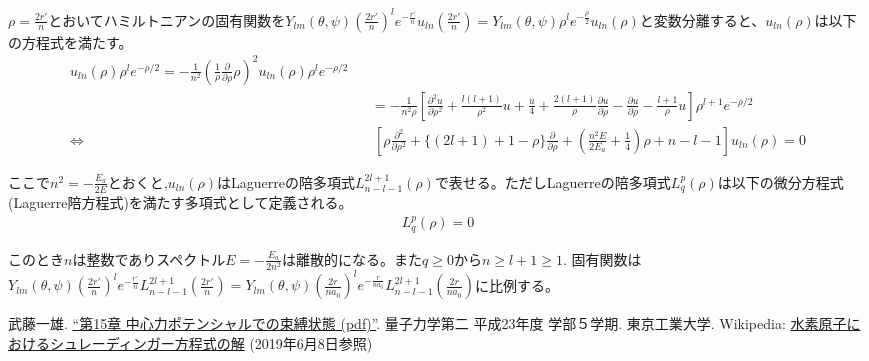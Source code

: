 \documentclass[11pt,a4paper]{jsarticle}
\begin{document}
$\rho=\frac{2r'}{n}$とおいてハミルトニアンの固有関数を$Y_{lm}(\theta,\psi)(\frac{2r'}{n})^l e^{-\frac{r'}{n}} u_{ln}(\frac{2r'}{n})=Y_{lm}(\theta,\psi) \rho^l e^{-\frac{\rho}{2}} u_{ln}(\rho)$と変数分離すると、$u_{ln}(\rho)$は以下の方程式を満たす。
\begin{eqnarray}
[ \frac{E}{2E_a} &&+ \frac{1}{n \rho} - \frac{l(l+1)}{n^2 \rho^2}]u_{ln}(\rho)\rho^l e^{-\rho/2} = -\frac{1}{n^2}(\frac{1}{\rho}\frac{\partial }{\partial \rho }\rho)^2  u_{ln}(\rho)\rho^l e^{-\rho/2}\\
&&= -\frac{1}{n^2 \rho} [\frac{\partial^2 u}{\partial \rho^2}+\frac{l(l+1)}{\rho^2}u +\frac{u}{4} +\frac{2(l+1)}{\rho}\frac{\partial u}{\partial \rho} -\frac{\partial u}{\partial \rho} -\frac{l+1}{ \rho} u] \rho^{l+1} e^{-\rho/2}\\
\Leftrightarrow && \: [ \rho \frac{\partial^2}{\partial \rho^2} + \{ (2l+1)+1-\rho \} \frac{\partial}{\partial \rho} + (\frac{n^2 E}{2E_a} + \frac{1}{4})\rho + n-l-1] u_{ln}(\rho) =0
\end{eqnarray}

ここで$n^2=-\frac{E_a}{2E}$とおくと,$u_{ln}(\rho)$はLaguerreの陪多項式$L^{2l+1}_{n-l-1}(\rho)$で表せる。ただしLaguerreの陪多項式$L^{p}_{q}(\rho)$は以下の微分方程式(Laguerre陪方程式)を満たす多項式として定義される。
\begin{eqnarray}
[ \rho \frac{\partial^2}{\partial \rho^2} + ( p+1-\rho ) \frac{\partial}{\partial \rho} + q] L^{p}_{q}(\rho)=0
\end{eqnarray}

このとき$n$は整数でありスペクトル$E=-\frac{E_a}{2n^2}$は離散的になる。また$q\ge0$から$n\ge l+1\ge1$. 固有関数は$Y_{lm}(\theta,\psi)(\frac{2r'}{n})^l e^{-\frac{r'}{n}} L^{2l+1}_{n-l-1}(\frac{2r'}{n})=Y_{lm}(\theta,\psi)(\frac{2r}{na_0})^l e^{-\frac{r}{na_0}} L^{2l+1}_{n-l-1}(\frac{2r}{na_0})$に比例する。


\begin{thebibliography}{9}
 武藤一雄. \href{http://www.th.phys.titech.ac.jp/~muto/lectures/QMII11/QMII11_chap15.pdf}{“第15章 中心力ポテンシャルでの束縛状態 (pdf)”}. 量子力学第二 平成23年度 学部５学期. 東京工業大学. 
 Wikipedia: \href{https://ja.wikipedia.org/wiki/水素原子におけるシュレーディンガー方程式の解}{水素原子におけるシュレーディンガー方程式の解} (2019年6月8日参照)
\end{thebibliography}
\end{document}
